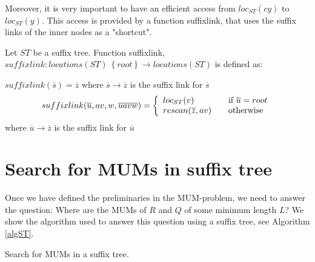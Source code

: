\documentclass[conference]{IEEEtran}
\begin{document}
Moreover, it is very important to have an efficient access from $loc_{ST}(cy)$ to $loc_{ST}(y)$. This access is provided by a function suffixlink, that uses the suffix links of the inner nodes as a "shortcut".
\begin{mydef}
Let $ST$ be a suffix tree. Function suffixlink, $suffixlink:locations(ST)\ \left\lbrace root\right\rbrace\rightarrow locations(ST)$ is defined as:
\begin{center}
$suffixlink(\overline{s})=\overline{z}$
where $\overline{s}\rightarrow\overline{z}$ is the suffix link for $\overline{s}$
\[ suffixlink(\overline{u},av,w,\overline{uavw})= \left\{ 
  \begin{array}{l l}
    loc_{ST}(v) & \quad \text{if $\overline{u}=root$}\\
    rescan(\overline{z},av) & \quad \text{otherwise}
  \end{array} \right.\]
  where $\overline{u}\rightarrow \overline{z}$ is the suffix link for $\overline{u}$
\end{center}
\end{mydef}

\section{Search for MUMs in suffix tree}
Once we have defined the preliminaries in the MUM-problem, we need to answer the question: Where are the MUMs of $R$ and $Q$ of some minimum length $L$? We show the algorithm used to answer this question using a suffix tree, see Algorithm \ref{algST}.
\begin{algorithm}[h]
  \label{algST}
  \Input{\R, \Q, \Len}
  \caption{Search for MUMs in a suffix tree.}
\end{algorithm}
\end{document}
